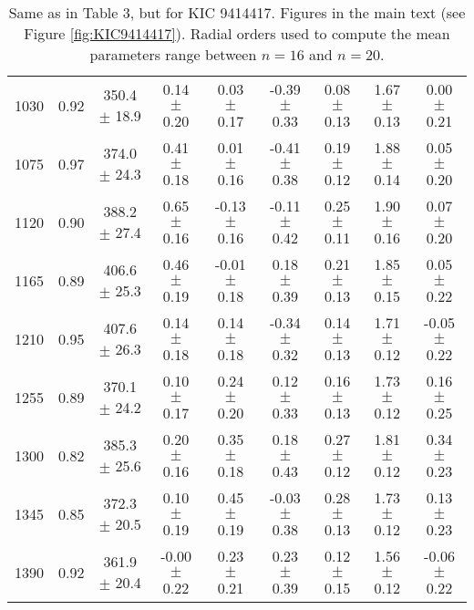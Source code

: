 \documentclass[twocolumn]{aastex61}%
\begin{document}
\begin{table*}[ht]
\begin{tabular}{ccc|ccccc|c}
1030 & 0.92 & 350.4 $\pm$ 18.9 & 0.14 $\pm$ 0.20 & 0.03 $\pm$ 0.17 & -0.39 $\pm$ 0.33 & 0.08 $\pm$ 0.13 & 1.67 $\pm$ 0.13 & 0.00 $\pm$ 0.21\\
1075 & 0.97 & 374.0 $\pm$ 24.3 & 0.41 $\pm$ 0.18 & 0.01 $\pm$ 0.16 & -0.41 $\pm$ 0.38 & 0.19 $\pm$ 0.12 & 1.88 $\pm$ 0.14 & 0.05 $\pm$ 0.20\\
1120 & 0.90 & 388.2 $\pm$ 27.4 & 0.65 $\pm$ 0.16 & -0.13 $\pm$ 0.16 & -0.11 $\pm$ 0.42 & 0.25 $\pm$ 0.11 & 1.90 $\pm$ 0.16 & 0.07 $\pm$ 0.20\\
1165 & 0.89 & 406.6 $\pm$ 25.3 & 0.46 $\pm$ 0.19 & -0.01 $\pm$ 0.18 & 0.18 $\pm$ 0.39 & 0.21 $\pm$ 0.13 & 1.85 $\pm$ 0.15 & 0.05 $\pm$ 0.22\\
1210 & 0.95 & 407.6 $\pm$ 26.3 & 0.14 $\pm$ 0.18 & 0.14 $\pm$ 0.18 & -0.34 $\pm$ 0.32 & 0.14 $\pm$ 0.13 & 1.71 $\pm$ 0.12 & -0.05 $\pm$ 0.22\\
1255 & 0.89 & 370.1 $\pm$ 24.2 & 0.10 $\pm$ 0.17 & 0.24 $\pm$ 0.20 & 0.12 $\pm$ 0.33 & 0.16 $\pm$ 0.13 & 1.73 $\pm$ 0.12 & 0.16 $\pm$ 0.25\\
1300 & 0.82 & 385.3 $\pm$ 25.6 & 0.20 $\pm$ 0.16 & 0.35 $\pm$ 0.18 & 0.18 $\pm$ 0.43 & 0.27 $\pm$ 0.12 & 1.81 $\pm$ 0.12 & 0.34 $\pm$ 0.23\\
1345 & 0.85 & 372.3 $\pm$ 20.5 & 0.10 $\pm$ 0.19 & 0.45 $\pm$ 0.19 & -0.03 $\pm$ 0.38 & 0.28 $\pm$ 0.13 & 1.73 $\pm$ 0.12 & 0.13 $\pm$ 0.23\\
1390 & 0.92 & 361.9 $\pm$ 20.4 & -0.00 $\pm$ 0.22 & 0.23 $\pm$ 0.21 & 0.23 $\pm$ 0.39 & 0.12 $\pm$ 0.15 & 1.56 $\pm$ 0.12 & -0.06 $\pm$ 0.22\\
\end{tabular}
\caption{Same as in Table 3, but for KIC 9414417. Figures in the main text (see Figure \ref{fig:KIC9414417}). Radial orders used to compute the mean parameters range between $n=16$ and $n=20$.}\label{tab:9414417}
\end{table*}
\end{document}
